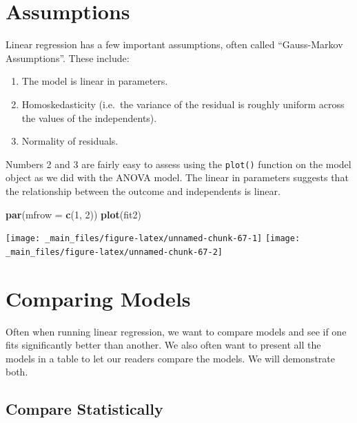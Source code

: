 \documentclass[]{tufte-book}
\newenvironment{Shaded}{}{}
\newcommand{\KeywordTok}[1]{\textcolor[rgb]{0.00,0.44,0.13}{\textbf{#1}}}
\newcommand{\DataTypeTok}[1]{\textcolor[rgb]{0.56,0.13,0.00}{#1}}
\newcommand{\DecValTok}[1]{\textcolor[rgb]{0.25,0.63,0.44}{#1}}
\newcommand{\NormalTok}[1]{#1}
\providecommand{\tightlist}{%
  \setlength{\itemsep}{0pt}\setlength{\parskip}{0pt}}
\theoremstyle{definition}
\theoremstyle{definition}
\theoremstyle{remark}
\begin{document}
\section*{Assumptions}\label{assumptions-1}

Linear regression has a few important assumptions, often called
``Gauss-Markov Assumptions''. These include:

\begin{enumerate}
\def\labelenumi{\arabic{enumi}.}
\tightlist
\item
  The model is linear in parameters.
\item
  Homoskedasticity (i.e.~the variance of the residual is roughly uniform
  across the values of the independents).
\item
  Normality of residuals.
\end{enumerate}

Numbers 2 and 3 are fairly easy to assess using the \texttt{plot()}
function on the model object as we did with the ANOVA model. The linear
in parameters suggests that the relationship between the outcome and
independents is linear.

\begin{Shaded}
\begin{Highlighting}[]
\KeywordTok{par}\NormalTok{(}\DataTypeTok{mfrow =} \KeywordTok{c}\NormalTok{(}\DecValTok{1}\NormalTok{, }\DecValTok{2}\NormalTok{))}
\KeywordTok{plot}\NormalTok{(fit2)}
\end{Highlighting}
\end{Shaded}

\texttt{[image: \_main\_files/figure-latex/unnamed-chunk-67-1]}
\texttt{[image: \_main\_files/figure-latex/unnamed-chunk-67-2]}

\section*{Comparing Models}\label{comparing-models}

Often when running linear regression, we want to compare models and see
if one fits significantly better than another. We also often want to
present all the models in a table to let our readers compare the models.
We will demonstrate both.

\subsection*{Compare Statistically}\label{compare-statistically}
\end{document}
